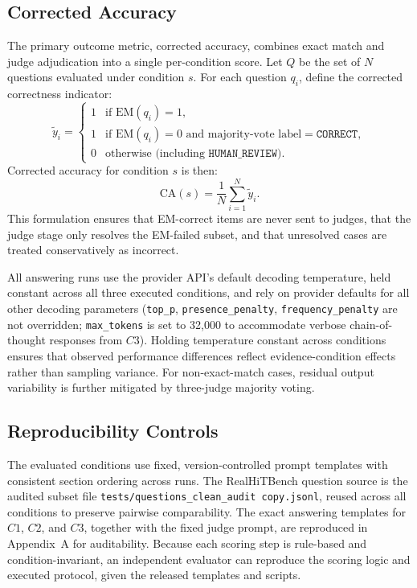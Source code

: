 ﻿\documentclass[a4paper]{article}
\begin{document}
\subsection{Corrected Accuracy}

The primary outcome metric, corrected accuracy, combines exact match and judge adjudication into a single per-condition score. Let $Q$ be the set of $N$ questions evaluated under condition $s$. For each question $q_i$, define the corrected correctness indicator:
\[
\tilde{y}_i =
\begin{cases}
1 & \text{if } \mathrm{EM}(q_i) = 1, \\
1 & \text{if } \mathrm{EM}(q_i) = 0 \text{ and majority-vote label} = \texttt{CORRECT}, \\
0 & \text{otherwise (including } \texttt{HUMAN\_REVIEW}\text{).}
\end{cases}
\]
Corrected accuracy for condition $s$ is then:
\[
\mathrm{CA}(s) = \frac{1}{N} \sum_{i=1}^{N} \tilde{y}_i.
\]
This formulation ensures that EM-correct items are never sent to judges, that the judge stage only resolves the EM-failed subset, and that unresolved cases are treated conservatively as incorrect.

All answering runs use the provider API's default decoding temperature, held constant across all three executed conditions, and rely on provider defaults for all other decoding parameters (\texttt{top\_p}, \texttt{presence\_penalty}, \texttt{frequency\_penalty} are not overridden; \texttt{max\_tokens} is set to 32{,}000 to accommodate verbose chain-of-thought responses from \(C3\)). Holding temperature constant across conditions ensures that observed performance differences reflect evidence-condition effects rather than sampling variance. For non-exact-match cases, residual output variability is further mitigated by three-judge majority voting.

\subsection{Reproducibility Controls}

The evaluated conditions use fixed, version-controlled prompt templates with consistent section ordering across runs. The RealHiTBench question source is the audited subset file \texttt{tests/questions\_clean\_audit copy.jsonl}, reused across all conditions to preserve pairwise comparability. The exact answering templates for \(C1\), \(C2\), and \(C3\), together with the fixed judge prompt, are reproduced in Appendix~A for auditability. Because each scoring step is rule-based and condition-invariant, an independent evaluator can reproduce the scoring logic and executed protocol, given the released templates and scripts.
\end{document}
